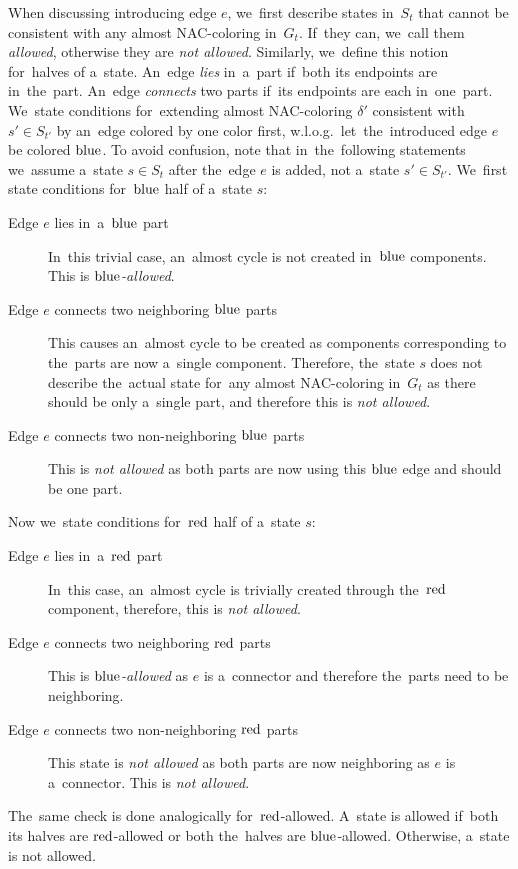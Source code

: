 When discussing \IntroduceEdgeNode{} introducing edge \( e \),
we~first describe states in~\( S_{t} \)
that cannot be consistent with any almost NAC-coloring in~\( G_t \).
If~they can, we~call them \emph{allowed}, otherwise they are \emph{not allowed}.
Similarly, we~define this notion for~halves of a~state.
%
An~edge \emph{lies} in~a~part if~both its endpoints are in~the~part.
An~edge \emph{connects} two parts if~its endpoints are each in~one~part.
%
We~state conditions for~extending almost NAC-coloring \( \delta' \)
consistent with \( s' \in S_{t'} \)
by an~edge colored by one color first,
w.l.o.g.\ let~the~introduced edge \( e \) be colored \( \text{blue} \).
%
To avoid confusion, note that in~the~following statements we~assume
a~state \( s \in S_t \) after the~edge \( e \) is added, not a~state \( s' \in S_{t'} \).
%
We~first state conditions for~\( \text{blue} \) half of a~state \( s \):
%
\begin{description}
	\item[Edge \( e \) lies in~a~\( \text{blue} \) part]
	      In~this trivial case, an~almost cycle is not created in~\( \text{blue} \) components.
	      This is \emph{\( \text{blue} \)-allowed}.
	\item[Edge \( e \) connects two neighboring \( \text{blue} \) parts]
	      This causes an~almost cycle to be created as
	      components corresponding to the~parts
	      are now a~single component.
	      Therefore, the~state \( s \) does not describe
	      the~actual state for~any almost NAC-coloring in~\( G_t \)
	      as there should be only a~single part, and therefore this is \emph{not allowed}.
	\item[Edge \( e \) connects two non-neighboring \( \text{blue} \) parts]
	      This is \emph{not allowed} as both parts
	      are now using this \( \text{blue} \) edge and should be one part.
\end{description}
%
Now we~state conditions for~\( \text{red} \) half of a~state \( s \):
%
\begin{description}
	\item[Edge \( e \) lies in~a~\( \text{red} \) part]
	      In~this case, an~almost cycle is trivially created
	      through the~\( \text{red} \) component,
	      therefore, this is \emph{not allowed}.
	\item[Edge \( e \) connects two neighboring \( \text{red} \) parts]
	      This is \emph{\( \text{blue} \)-allowed} as \( e \) is a~connector and
	      therefore the~parts need to be neighboring.
	\item[Edge \( e \) connects two non-neighboring \( \text{red} \) parts]
	      This state is \emph{not allowed} as both parts
	      are now neighboring as \( e \) is a~connector.
	      This is \emph{not allowed}.
\end{description}
%
The~same check is done analogically for~\( \text{red} \)-allowed.
A~state is allowed if~both its halves are \( \text{red} \)-allowed or
both the~halves are \( \text{blue} \)-allowed.
Otherwise, a~state is not allowed.

